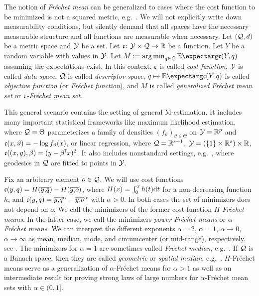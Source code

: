The notion of \textit{Fréchet mean} can be generalized to cases where the cost function to be minimized is not a squared metric, e.g.\ \cite{huckemann11}. We will not explicitly write down measurability conditions, but silently demand that all spaces have the necessary measurable structure and all functions are measurable when necessary. Let $(\mathcal{Q}, d)$ be a metric space and $\mathcal{Y}$ be a set. Let $\mathfrak{c} \colon \mathcal{Y} \times \mathcal{Q} \to \mathbb{R}$ be a function. Let $Y$ be a random variable with values in $\mathcal{Y}$. Let $M := \argmin_{q\in\mc Q} \Ex{\mf c(Y, q)}$ assuming the expectations exist. 
In this context, $\mathfrak{c}$ is called \textit{cost function}, $\mathcal{Y}$ is called \textit{data space}, $\mathcal{Q}$ is called \textit{descriptor space}, $q\mapsto\Ex{\mf c(Y, q)}$ is called \textit{objective function} (or \textit{Fréchet function}), and $M$ is called \textit{generalized Fréchet mean set} or \textit{$\mathfrak{c}$-Fréchet mean set}. 

This general scenario contains the setting of general M-estimation. It includes many important statistical frameworks like maximum likelihood estimation, where $\mathcal{Q} = \Theta$ parameterizes a family of densities $(f_\vartheta)_{\vartheta\in\Theta}$ on $\mathcal{Y} = \mathbb{R}^p$ and $\mathfrak{c}(x,\vartheta) = -\log f_{\vartheta}(x)$, or linear regression, where $\mathcal{Q} = \mathbb{R}^{s+1}$, $\mathcal{Y} = (\{1\}\times\mathbb{R}^s) \times \mathbb{R}$, $\mathfrak{c}((x,y),\beta) = (y - \beta\!^\top\! x)^2$. It also includes nonstandard settings, e.g.\ \cite{huckemann11}, where geodesics in $\mathcal{Q}$ are fitted to points in $\mathcal{Y}$.

Fix an arbitrary element $o\in\mathcal{Q}$. We will use cost functions $\mathfrak{c}(y, q) = H(\overline{y,\!q})-H(\overline{y,\!o})$, where $H(x) = \int_0^x h(t) \mathrm{d} t$ for a non-decreasing function $h$, and $\mathfrak{c}(y, q) = \overline{y,\!q}^\alpha-\overline{y,\!o}^\alpha$ with $\alpha>0$. In both cases the set of minimizers does not depend on $o$. We call the minimizers of the former cost function \textit{$H$-Fréchet means}. In the latter case, we call the minimizers \textit{power Fréchet means} or \textit{$\alpha$-Fréchet means}. We can interpret the different exponents $\alpha = 2$, $\alpha =1$, $\alpha \to 0$, $\alpha \to \infty$ as mean, median, mode, and circumcenter (or mid-range), respectively, see \cite{macqueen67}. The minimizers for $\alpha=1$ are sometimes called \textit{Fréchet median}, e.g.\ \cite{arnaudon13}. If $\mathcal{Q}$ is a Banach space, then they are called \textit{geometric} or \textit{spatial median}, e.g.\ \cite{kemperman87}.
$H$-Fréchet means serve as a generalization of $\alpha$-Fréchet means for $\alpha>1$ as well as an intermediate result for proving strong laws of large numbers for $\alpha$-Fréchet mean sets with $\alpha\in(0,1]$.

